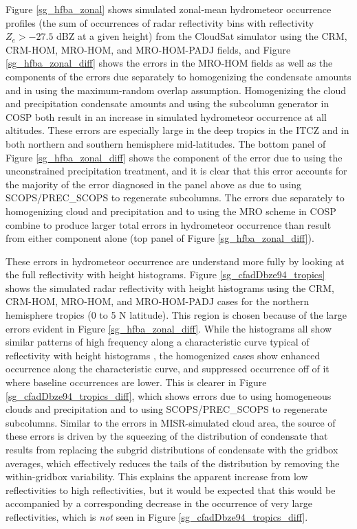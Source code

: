 Figure \ref{sg_hfba_zonal} shows simulated zonal-mean hydrometeor occurrence profiles (the sum of occurrences of radar reflectivity bins with reflectivity  $Z_e > -27.5$ dBZ at a given height) from the CloudSat simulator using the CRM, CRM-HOM, MRO-HOM, and MRO-HOM-PADJ fields, and Figure \ref{sg_hfba_zonal_diff} shows the errors in the MRO-HOM fields as well as the components of the errors due separately to homogenizing the condensate amounts and in using the maximum-random overlap assumption. Homogenizing the cloud and precipitation condensate amounts and using the subcolumn generator in COSP both result in an increase in simulated hydrometeor occurrence at all altitudes. These errors are especially large in the deep tropics in the ITCZ and in both northern and southern hemisphere mid-latitudes. The bottom panel of Figure \ref{sg_hfba_zonal_diff} shows the component of the error due to using the unconstrained precipitation treatment, and it is clear that this error accounts for the majority of the error diagnosed in the panel above as due to using SCOPS/PREC\_SCOPS to regenerate subcolumns. The errors due separately to homogenizing cloud and precipitation and to using the MRO scheme in COSP combine to produce larger total errors in hydrometeor occurrence than result from either component alone (top panel of Figure \ref{sg_hfba_zonal_diff}). 

These errors in hydrometeor occurrence are understand more fully by looking at the full reflectivity with height histograms. Figure \ref{sg_cfadDbze94_tropics} shows the simulated radar reflectivity with height histograms using the CRM, CRM-HOM, MRO-HOM, and MRO-HOM-PADJ cases for the northern hemisphere tropics (0 to 5 N latitude). This region is chosen because of the large errors evident in Figure \ref{sg_hfba_zonal_diff}. While the histograms all show similar patterns of high frequency along a characteristic curve typical of reflectivity with height histograms \citep[e.g.,][]{marchand_et_al_2009}, the homogenized cases show enhanced occurrence along the characteristic curve, and suppressed occurrence off of it where baseline occurrences are lower. This is clearer in Figure \ref{sg_cfadDbze94_tropics_diff}, which shows errors due to using homogeneous clouds and precipitation and to using SCOPS/PREC\_SCOPS to regenerate subcolumns. Similar to the errors in MISR-simulated cloud area, the source of these errors is driven by the squeezing of the distribution of condensate that results from replacing the subgrid distributions of condensate with the gridbox averages, which effectively reduces the tails of the distribution by removing the within-gridbox variability. This explains the apparent increase from low reflectivities to high reflectivities, but it would be expected that this would be accompanied by a corresponding decrease in the occurrence of very large reflectivities, which is \emph{not} seen in Figure \ref{sg_cfadDbze94_tropics_diff}. 
 
